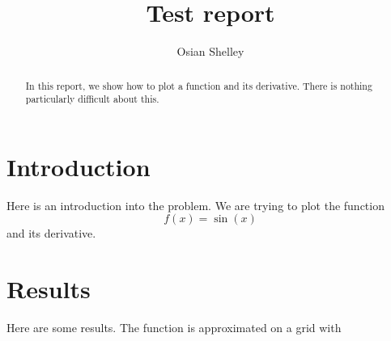 \documentclass[10pt]{article}
\begin{document}
\title{Test report}
\author{Osian Shelley}


\maketitle
\begin{abstract}
  In this report, we show how to plot a function and its
  derivative. There is nothing particularly difficult about this.
\end{abstract}

\section{Introduction}

Here is an introduction into the problem. We are trying to plot the function
\begin{equation}
  f(x) = \sin(x)
\end{equation}
and its derivative.

\section{Results}

Here are some results. The function is approximated on a grid with
\end{document}
